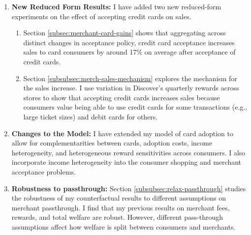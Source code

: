 \documentclass[main.tex]{subfiles}
\begin{document}
{\begin{enumerate}
        \item \textbf{New Reduced Form Results: } I have added two new reduced-form experiments on the effect of accepting credit cards on sales.
        \begin{enumerate}
            \item Section \ref{subsec:merchant-card-gains} shows that aggregating across distinct changes in acceptance policy, credit card acceptance increases sales to card consumers by around 17\% on average after acceptance of credit cards. 
            \item Section \ref{subsubsec:merch-sales-mechanism} explores the mechanism for the sales increase.
I use variation in Discover's quarterly rewards across stores to show that accepting credit cards increases sales because consumers value being able to use credit cards for some transactions (e.g., large ticket sizes) and debit cards for others.
        \end{enumerate}
        
        \item \textbf{Changes to the Model: }  I have extended my model of card adoption to allow for complementarities between cards, adoption costs, income heterogeneity, and heterogeneous reward sensitivities across consumers.
I also incorporate income heterogeneity into the consumer shopping and merchant acceptance problems.
        
        \item \textbf{Robustness to passthrough: }  Section \ref{subsubsec:relax-passthrough} studies the robustness of my counterfactual results to different assumptions on merchant passthrough.
I find that my previous results on merchant fees, rewards, and total welfare are robust.
However, different pass-through assumptions affect how welfare is split between consumers and merchants.
    \end{enumerate}
}
\end{document}
